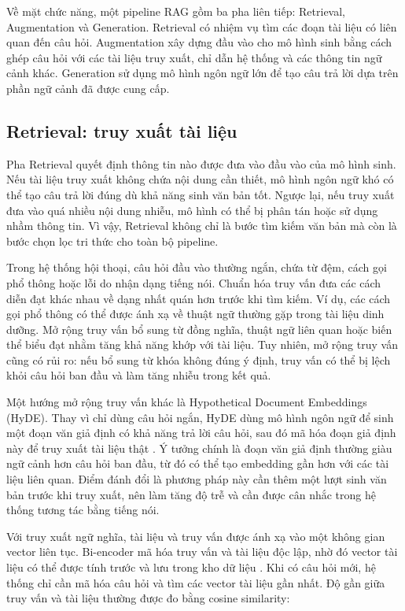 \documentclass[a4paper,13pt,twoside]{report}
\begin{document}
Về mặt chức năng, một pipeline RAG gồm ba pha liên tiếp: Retrieval, Augmentation và Generation. Retrieval có nhiệm vụ tìm các đoạn tài liệu có liên quan đến câu hỏi. Augmentation xây dựng đầu vào cho mô hình sinh bằng cách ghép câu hỏi với các tài liệu truy xuất, chỉ dẫn hệ thống và các thông tin ngữ cảnh khác. Generation sử dụng mô hình ngôn ngữ lớn để tạo câu trả lời dựa trên phần ngữ cảnh đã được cung cấp.
\subsection{Retrieval: truy xuất tài liệu}

Pha Retrieval quyết định thông tin nào được đưa vào đầu vào của mô hình sinh. Nếu tài liệu truy xuất không chứa nội dung cần thiết, mô hình ngôn ngữ khó có thể tạo câu trả lời đúng dù khả năng sinh văn bản tốt. Ngược lại, nếu truy xuất đưa vào quá nhiều nội dung nhiễu, mô hình có thể bị phân tán hoặc sử dụng nhầm thông tin. Vì vậy, Retrieval không chỉ là bước tìm kiếm văn bản mà còn là bước chọn lọc tri thức cho toàn bộ pipeline.

Trong hệ thống hội thoại, câu hỏi đầu vào thường ngắn, chứa từ đệm, cách gọi phổ thông hoặc lỗi do nhận dạng tiếng nói. Chuẩn hóa truy vấn đưa các cách diễn đạt khác nhau về dạng nhất quán hơn trước khi tìm kiếm. Ví dụ, các cách gọi phổ thông có thể được ánh xạ về thuật ngữ thường gặp trong tài liệu dinh dưỡng. Mở rộng truy vấn bổ sung từ đồng nghĩa, thuật ngữ liên quan hoặc biến thể biểu đạt nhằm tăng khả năng khớp với tài liệu. Tuy nhiên, mở rộng truy vấn cũng có rủi ro: nếu bổ sung từ khóa không đúng ý định, truy vấn có thể bị lệch khỏi câu hỏi ban đầu và làm tăng nhiễu trong kết quả.

Một hướng mở rộng truy vấn khác là Hypothetical Document Embeddings (HyDE). Thay vì chỉ dùng câu hỏi ngắn, HyDE dùng mô hình ngôn ngữ để sinh một đoạn văn giả định có khả năng trả lời câu hỏi, sau đó mã hóa đoạn giả định này để truy xuất tài liệu thật \cite{hyde}. Ý tưởng chính là đoạn văn giả định thường giàu ngữ cảnh hơn câu hỏi ban đầu, từ đó có thể tạo embedding gần hơn với các tài liệu liên quan. Điểm đánh đổi là phương pháp này cần thêm một lượt sinh văn bản trước khi truy xuất, nên làm tăng độ trễ và cần được cân nhắc trong hệ thống tương tác bằng tiếng nói.

Với truy xuất ngữ nghĩa, tài liệu và truy vấn được ánh xạ vào một không gian vector liên tục. Bi-encoder mã hóa truy vấn và tài liệu độc lập, nhờ đó vector tài liệu có thể được tính trước và lưu trong kho dữ liệu \cite{sbert}. Khi có câu hỏi mới, hệ thống chỉ cần mã hóa câu hỏi và tìm các vector tài liệu gần nhất. Độ gần giữa truy vấn và tài liệu thường được đo bằng cosine similarity:
\end{document}
